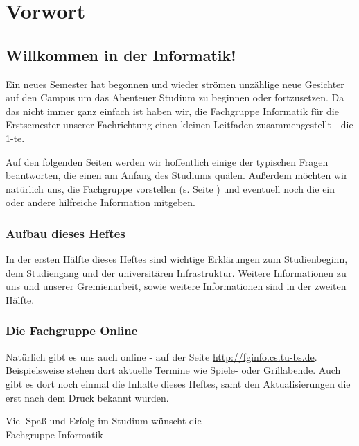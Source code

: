 
\section{Vorwort}
\label{vorwort}
	\begin{multicols}{2}
	\subsection*{Willkommen in der Informatik!}	

	Ein neues Semester hat begonnen und wieder strömen unzählige neue Gesichter auf den Campus um das Abenteuer Studium zu beginnen oder fortzusetzen. Da das nicht immer ganz einfach ist haben wir, die Fachgruppe Informatik für die Erstsemester unserer Fachrichtung einen kleinen Leitfaden zusammengestellt - die 1-te.

	Auf den folgenden Seiten werden wir hoffentlich einige der typischen Fragen beantworten, die einen am Anfang des Studiums quälen. Außerdem möchten wir natürlich uns, die Fachgruppe vorstellen (s. Seite \pageref{fachgruppe}) und eventuell noch die ein oder andere hilfreiche Information mitgeben. 

	\subsubsection*{Aufbau dieses Heftes}
		In der ersten Hälfte dieses Heftes sind wichtige
		Erklärungen zum Studienbeginn, dem Studiengang und der
		universitären Infrastruktur. Weitere Informationen zu
		uns und unserer Gremienarbeit, sowie weitere
		Informationen sind in der zweiten Hälfte.
\columnbreak
	\subsubsection*{Die Fachgruppe Online}
		Natürlich gibt es uns auch online - auf der Seite \url{http://fginfo.cs.tu-bs.de}. Beispielsweise stehen dort aktuelle Termine wie Spiele- oder Grillabende. Auch gibt es dort noch einmal die Inhalte dieses Heftes, samt den Aktualisierungen die erst nach dem Druck bekannt wurden. 

	\vspace*{0.5cm}

	Viel Spaß und Erfolg im  Studium wünscht  die\\
	\hspace*{2cm}Fachgruppe Informatik
	\end{multicols}
	\vspace{0.5cm}
